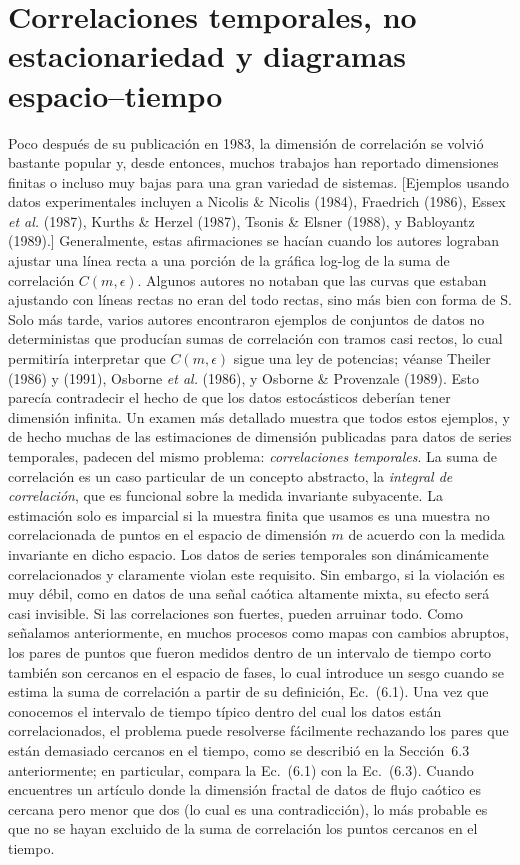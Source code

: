 \documentclass[10pt,a4paper]{book}
\begin{document}
\newpage

\section{Correlaciones temporales, no estacionariedad y diagramas espacio–tiempo}

Poco después de su publicación en 1983, la dimensión de correlación se volvió bastante popular y, desde entonces, muchos trabajos han reportado dimensiones finitas o incluso muy bajas para una gran variedad de sistemas. [Ejemplos usando datos experimentales incluyen a Nicolis \& Nicolis (1984), Fraedrich (1986), Essex \textit{et al.} (1987), Kurths \& Herzel (1987), Tsonis \& Elsner (1988), y Babloyantz (1989).] Generalmente, estas afirmaciones se hacían cuando los autores lograban ajustar una línea recta a una porción de la gráfica log-log de la suma de correlación $C(m, \epsilon)$. Algunos autores no notaban que las curvas que estaban ajustando con líneas rectas no eran del todo rectas, sino más bien con forma de S. Solo más tarde, varios autores encontraron ejemplos de conjuntos de datos no deterministas que producían sumas de correlación con tramos casi rectos, lo cual permitiría interpretar que $C(m, \epsilon)$ sigue una ley de potencias; véanse Theiler (1986) y (1991), Osborne \textit{et al.} (1986), y Osborne \& Provenzale (1989). Esto parecía contradecir el hecho de que los datos estocásticos deberían tener dimensión infinita. Un examen más detallado muestra que todos estos ejemplos, y de hecho muchas de las estimaciones de dimensión publicadas para datos de series temporales, padecen del mismo problema: \textit{correlaciones temporales}. La suma de correlación es un caso particular de un concepto abstracto, la \textit{integral de correlación}, que es funcional sobre la medida invariante subyacente. La estimación solo es imparcial si la muestra finita que usamos es una muestra no correlacionada de puntos en el espacio de dimensión $m$ de acuerdo con la medida invariante en dicho espacio. Los datos de series temporales son dinámicamente correlacionados y claramente violan este requisito. Sin embargo, si la violación es muy débil, como en datos de una señal caótica altamente mixta, su efecto será casi invisible. Si las correlaciones son fuertes, pueden arruinar todo. Como señalamos anteriormente, en muchos procesos como mapas con cambios abruptos, los pares de puntos que fueron medidos dentro de un intervalo de tiempo corto también son cercanos en el espacio de fases, lo cual introduce un sesgo cuando se estima la suma de correlación a partir de su definición, Ec.~(6.1). Una vez que conocemos el intervalo de tiempo típico dentro del cual los datos están correlacionados, el problema puede resolverse fácilmente rechazando los pares que están demasiado cercanos en el tiempo, como se describió en la Sección~6.3 anteriormente; en particular, compara la Ec.~(6.1) con la Ec.~(6.3). Cuando encuentres un artículo donde la dimensión fractal de datos de flujo caótico es cercana pero menor que dos (lo cual es una contradicción), lo más probable es que no se hayan excluido de la suma de correlación los puntos cercanos en el tiempo.
\end{document}
